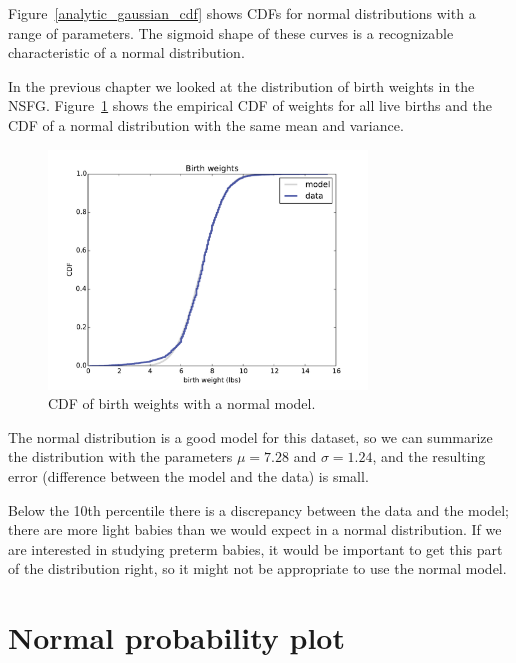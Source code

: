 \documentclass[12pt]{book}
\begin{document}
Figure~\ref{analytic_gaussian_cdf} shows CDFs for normal
distributions with a range of parameters.  The sigmoid shape of these
curves is a recognizable characteristic of a normal distribution.

In the previous chapter we looked at the distribution of birth
weights in the NSFG.  Figure~\ref{analytic_birthwgt_model} shows the
empirical CDF of weights for all live births and the CDF of
a normal distribution with the same mean and variance.

\begin{figure}
\centerline{\includegraphics[height=2.5in]{figs/analytic_birthwgt_model.pdf}}
\caption{CDF of birth weights with a normal model.}
\label{analytic_birthwgt_model}
\end{figure}

The normal distribution is a good model for this dataset, so
we can summarize the distribution with the parameters
$\mu = 7.28$ and $\sigma = 1.24$, and the resulting error
(difference between the model and the data) is small.

Below the 10th percentile there is a discrepancy between the data
and the model; there are more light babies than we would expect in
a normal distribution.  If we are interested in studying preterm
babies, it would be important to get this part of the distribution
right, so it might not be appropriate to use the normal
model.


\section{Normal probability plot}
\end{document}

